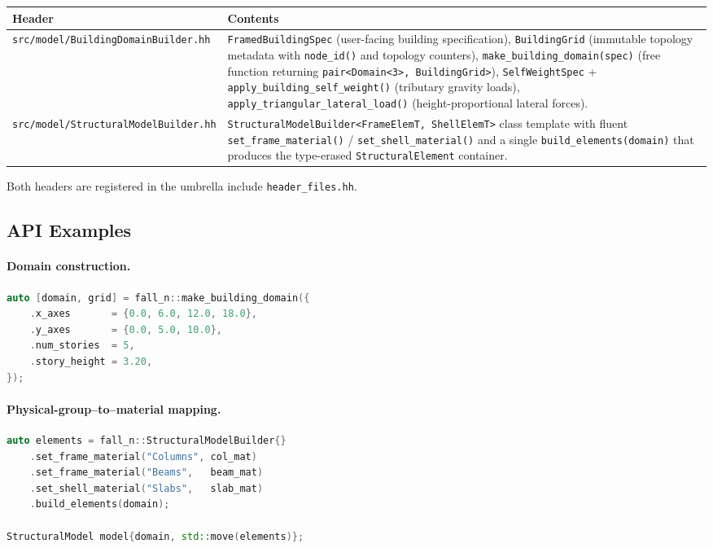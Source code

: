 \begin{center}
\small
\begin{tabular}{lp{8cm}}
\toprule
\textbf{Header} & \textbf{Contents} \\
\midrule
\texttt{src/model/BuildingDomainBuilder.hh}
  & \texttt{FramedBuildingSpec} (user-facing building specification),
    \texttt{BuildingGrid} (immutable topology metadata with
    \texttt{node\_id()} and topology counters),
    \texttt{make\_building\_domain(spec)} (free function returning
    \texttt{pair<Domain<3>, BuildingGrid>}),
    \texttt{SelfWeightSpec} + \texttt{apply\_building\_self\_weight()}
    (tributary gravity loads),
    \texttt{apply\_triangular\_lateral\_load()} (height-proportional
    lateral forces). \\
\addlinespace
\texttt{src/model/StructuralModelBuilder.hh}
  & \texttt{StructuralModelBuilder<FrameElemT, ShellElemT>}
    class template with fluent \texttt{set\_frame\_material()} /
    \texttt{set\_shell\_material()} and a single
    \texttt{build\_elements(domain)} that produces the type-erased
    \texttt{StructuralElement} container. \\
\bottomrule
\end{tabular}
\end{center}

Both headers are registered in the umbrella include
\texttt{header\_files.hh}.

\subsection{API Examples}
\label{sec:phase3-api}

\paragraph{Domain construction.}
\begin{lstlisting}[language=C++,basicstyle=\small\ttfamily]
auto [domain, grid] = fall_n::make_building_domain({
    .x_axes       = {0.0, 6.0, 12.0, 18.0},
    .y_axes       = {0.0, 5.0, 10.0},
    .num_stories  = 5,
    .story_height = 3.20,
});
\end{lstlisting}

\paragraph{Physical-group--to--material mapping.}
\begin{lstlisting}[language=C++,basicstyle=\small\ttfamily]
auto elements = fall_n::StructuralModelBuilder{}
    .set_frame_material("Columns", col_mat)
    .set_frame_material("Beams",   beam_mat)
    .set_shell_material("Slabs",   slab_mat)
    .build_elements(domain);

StructuralModel model{domain, std::move(elements)};
\end{lstlisting}

